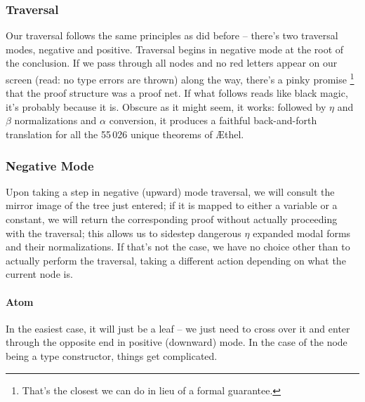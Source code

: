 \subsubsection{Traversal}
Our traversal follows the same principles as did before -- there's two traversal modes, negative and positive.
Traversal begins in negative mode at the root of the conclusion.
If we pass through all nodes and no red letters appear on our screen (read: no type errors are thrown) along the way, there's a pinky promise%
	\footnote{That's the closest we can do in lieu of a formal guarantee.}
that the proof structure was a proof net.
If what follows reads like black magic, it's probably because it is.
Obscure as it might seem, it works: followed by $\eta$ and $\beta$ normalizations and $\alpha$ conversion, it produces a faithful back-and-forth translation for all the 55\,026 unique theorems of \AE thel.


\subsubsection{Negative Mode}
Upon taking a step in negative (upward) mode traversal, we will consult the mirror image of the tree just entered; if it is mapped to either a variable or a constant, we will return the corresponding proof without actually proceeding with the traversal; this allows us to sidestep dangerous $\eta$ expanded modal forms and their normalizations.
If that's not the case, we have no choice other than to actually perform the traversal, taking a different action depending on what the current node is.

\paragraph{Atom}
In the easiest case, it will just be a leaf -- we just need to cross over it and enter through the opposite end in positive (downward) mode.
In the case of the node being a type constructor, things get complicated.

